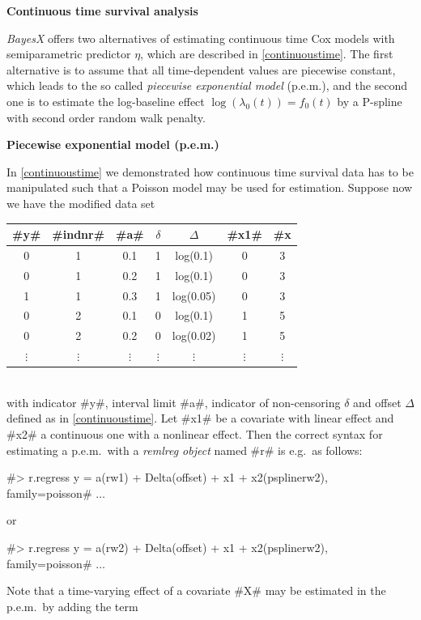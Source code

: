 \textbf{Continuous time survival analysis}

\textit{BayesX} offers two alternatives of estimating continuous
time Cox models with semiparametric predictor $\eta$, which are
described in \autoref{continuoustime}. The first alternative is to
assume that all time-dependent values are piecewise constant,
which leads to the so called \textit{piecewise exponential model}
(p.e.m.), and the second one is to estimate the log-baseline
effect $\log(\lambda_0(t))=f_0(t)$ by a P-spline with second order
random walk penalty.

\textbf{Piecewise exponential model (p.e.m.)}

In \autoref{continuoustime} we demonstrated how continuous time
survival data has to be manipulated such that a Poisson model may
be used for estimation. Suppose now we have the modified data set
\vspace{0.5cm}\\
\begin{tabular}{c|c|c|c|c|c|c}
#y# & #indnr# & #a# & $\delta$ &  $\Delta$ &   #x1# &
#x#2\\\hline\hline
0 &  1 &   0.1 &   1  &  log(0.1) & 0  & 3\\
0  & 1   & 0.2  &  1  &  log(0.1) & 0 &  3\\
1  & 1   & 0.3  &  1  &  log(0.05)& 0  & 3\\\hline
0 &  2 &   0.1 &   0 &   log(0.1) & 1 &  5\\
0  & 2  &  0.2 &   0  &  log(0.02)& 1 &  5\\\hline
$\vdots$ & $\vdots$ & $\vdots$ & $\vdots$ & $\vdots$ & $\vdots$& $\vdots$\\
\end{tabular}
\vspace{0.5cm}\\
with indicator #y#, interval limit #a#, indicator of non-censoring
$\delta$ and offset $\Delta$ defined as in
\autoref{continuoustime}. Let #x1# be a covariate with linear
effect and #x2# a continuous one with a nonlinear effect. Then the
correct syntax for estimating a p.e.m.~with a {\em remlreg object}
named #r# is e.g.~as follows:

 #> r.regress y = a(rw1) + Delta(offset) + x1 + x2(psplinerw2), family=poisson# $\ldots$

or

 #> r.regress y = a(rw2) + Delta(offset) + x1 + x2(psplinerw2), family=poisson# $\ldots$

Note that a time-varying effect of a covariate #X# may be
estimated in the p.e.m.~by adding the term

